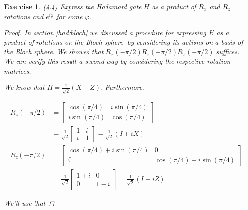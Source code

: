 \documentclass[11pt]{article}
\newcommand\0{\mathbf{0}}
\newcommand\<{\langle}
\renewcommand\>{\rangle}
\renewcommand\phi{\varphi}
\newtheorem{exercise}[theorem]{Exercise}
\begin{document}
\begin{exercise} (4.4) Express the Hadamard gate $H$ as a product of $R_x$ and $R_z$ rotations and $e^{i \phi}$ for some $\phi $.
\begin{proof}

	In section \ref{had:bloch} we discussed a procedure for expressing $H$ as a product of rotations on the Bloch sphere, by considering its actions on a basis of the Bloch sphere. We showed that $R_x(-\pi / 2)R_z(-\pi / 2)R_x(-\pi / 2)$ suffices. We can verify this result a second way by considering the respective rotation matrices. 
	 
	We know that $H = \frac{1}{\sqrt{2}} (X + Z)$. Furthermore, 
	
	\begin{align*}
	R_x(-\pi / 2) &= \begin{bmatrix}
 \cos(\pi / 4) & i\sin(\pi / 4) \\ i\sin(\pi / 4) & \cos(\pi / 4)	
 \end{bmatrix} \\
&= \frac{1}{\sqrt{2}} \begin{bmatrix}
 	1 & i \\ i & 1 
 \end{bmatrix} = \frac{1}{\sqrt{2}}( I + iX) \\
 R_z(-\pi / 2) &= \begin{bmatrix}
 \cos(\pi / 4) + i\sin(\pi / 4) & 0 \\ 0 & \cos(\pi / 4)	 - i\sin (\pi / 4)
 \end{bmatrix} \\
&= \frac{1}{\sqrt{2}} \begin{bmatrix}
 	1 + i & 0 \\ 0 & 1-i
 \end{bmatrix} = \frac{1}{\sqrt{2}}( I + iZ)
\end{align*}

We'll use that 


\end{proof}
\end{exercise}
\end{document}
